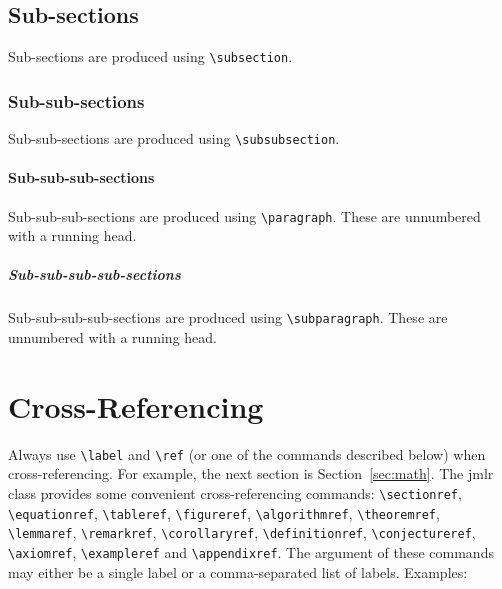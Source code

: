 \documentclass[pmlr]{jmlr}%
\begin{document}
\subsection{Sub-sections}

Sub-sections are produced using \verb|\subsection|.

\subsubsection{Sub-sub-sections}

Sub-sub-sections are produced using \verb|\subsubsection|.

\paragraph{Sub-sub-sub-sections}

Sub-sub-sub-sections are produced using \verb|\paragraph|.
These are unnumbered with a running head.

\subparagraph{Sub-sub-sub-sub-sections}

Sub-sub-sub-sub-sections are produced using \verb|\subparagraph|.
These are unnumbered with a running head.

\section{Cross-Referencing}

Always use \verb|\label| and \verb|\ref| (or one of the commands
described below) when cross-referencing.  For example, the next
section is Section~\ref{sec:math}. The \textsf{jmlr} class
provides some convenient cross-referencing commands:
\verb|\sectionref|, \verb|\equationref|, \verb|\tableref|,
\verb|\figureref|, \verb|\algorithmref|, \verb|\theoremref|,
\verb|\lemmaref|, \verb|\remarkref|, \verb|\corollaryref|,
\verb|\definitionref|, \verb|\conjectureref|, \verb|\axiomref|,
\verb|\exampleref| and \verb|\appendixref|. The argument of these
commands may either be a single label or a comma-separated list
of labels. Examples:
\end{document}
